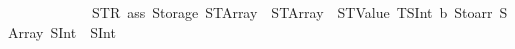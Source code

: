 \begin{isabellebody}
\ \ \ \ \ \ \ \ \ \ \ \ {\isacharbrackleft}{\kern0pt}{\isacharparenleft}{\kern0pt}{\isacharparenleft}{\kern0pt}STR\ {\isacharprime}{\kern0pt}{\isacharprime}{\kern0pt}a{\isacharunderscore}{\kern0pt}s{}{}{}{\isacharunderscore}{\kern0pt}{}{}{\isacharunderscore}{\kern0pt}s{}{\isacharprime}{\kern0pt}{\isacharprime}{\kern0pt}{\isacharparenright}{\kern0pt}{\isacharcomma}{\kern0pt}\ Storage\ {\isacharparenleft}{\kern0pt}STArray\ {}\ {\isacharparenleft}{\kern0pt}STArray\ {}\ {\isacharparenleft}{\kern0pt}STValue\ {\isacharparenleft}{\kern0pt}TSInt\ b{}{}{}{\isacharparenright}{\kern0pt}{\isacharparenright}{\kern0pt}{\isacharparenright}{\kern0pt}{\isacharparenright}{\kern0pt}{\isacharcomma}{\kern0pt}\ Stoarr\ {\isacharbrackleft}{\kern0pt}SArray\ {\isacharbrackleft}{\kern0pt}SInt\ {}{}{}{}{}{}{}{}{}{}{}{}{}{}{}{}{}{}{}{}{}{}{}{}{}{}{}{}{}{}{}{}{}{}{}{}{\isacharcomma}{\kern0pt}\ SInt\ {}{}{}{}{}{}{}{}{}{}{}{}{}{}{}{}{}{}{}{}{}{}{}{}{}{}{}{}{}{}{}{}{}{}{}{}{\isacharbrackright}{\kern0pt}{\isacharbrackright}{\kern0pt}{\isacharparenright}{\kern0pt}{\isacharcomma}{\kern0pt}\isanewline

\end{isabellebody}

